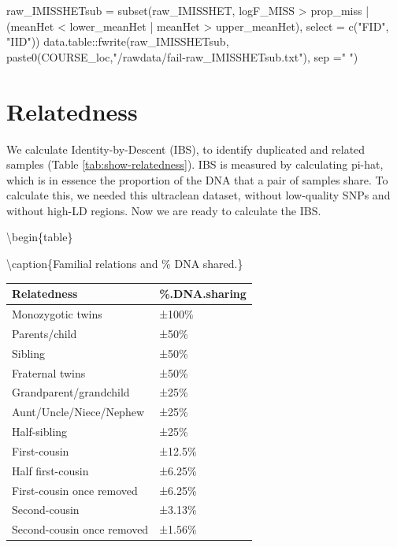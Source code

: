 \documentclass[
]{book}
\newenvironment{Shaded}{\begin{snugshade}}{\end{snugshade}}
\newcommand{\AttributeTok}[1]{\textcolor[rgb]{0.77,0.63,0.00}{#1}}
\newcommand{\FunctionTok}[1]{\textcolor[rgb]{0.00,0.00,0.00}{#1}}
\newcommand{\NormalTok}[1]{#1}
\newcommand{\OtherTok}[1]{\textcolor[rgb]{0.56,0.35,0.01}{#1}}
\newcommand{\SpecialCharTok}[1]{\textcolor[rgb]{0.00,0.00,0.00}{#1}}
\newcommand{\StringTok}[1]{\textcolor[rgb]{0.31,0.60,0.02}{#1}}
\begin{document}
\begin{Shaded}
\begin{Highlighting}[]
\NormalTok{raw\_IMISSHETsub }\OtherTok{=} \FunctionTok{subset}\NormalTok{(raw\_IMISSHET, logF\_MISS }\SpecialCharTok{\textgreater{}}\NormalTok{ prop\_miss }\SpecialCharTok{|}\NormalTok{ (meanHet }\SpecialCharTok{\textless{}}\NormalTok{ lower\_meanHet }\SpecialCharTok{|}\NormalTok{ meanHet }\SpecialCharTok{\textgreater{}}\NormalTok{ upper\_meanHet),}
                         \AttributeTok{select =} \FunctionTok{c}\NormalTok{(}\StringTok{"FID"}\NormalTok{, }\StringTok{"IID"}\NormalTok{))}
\NormalTok{data.table}\SpecialCharTok{::}\FunctionTok{fwrite}\NormalTok{(raw\_IMISSHETsub, }\FunctionTok{paste0}\NormalTok{(COURSE\_loc,}\StringTok{"/rawdata/fail{-}raw\_IMISSHETsub.txt"}\NormalTok{), }\AttributeTok{sep =}\StringTok{" "}\NormalTok{)}
\end{Highlighting}
\end{Shaded}

\hypertarget{relatedness}{%
\section{Relatedness}\label{relatedness}}

We calculate Identity-by-Descent (IBS), to identify duplicated and related samples (Table \ref{tab:show-relatedness}). IBS is measured by calculating pi-hat, which is in essence the proportion of the DNA that a pair of samples share. To calculate this, we needed this ultraclean dataset, without low-quality SNPs and without high-LD regions. Now we are ready to calculate the IBS.

\textbackslash begin\{table\}

\textbackslash caption\{\label{tab:show-relatedness}Familial relations and \% DNA shared.\}
\centering

\begin{tabular}[t]{l|l}
\hline
Relatedness & \%.DNA.sharing\\
\hline
Monozygotic twins & ±100\%\\
\hline
Parents/child & ±50\%\\
\hline
Sibling & ±50\%\\
\hline
Fraternal twins & ±50\%\\
\hline
Grandparent/grandchild & ±25\%\\
\hline
Aunt/Uncle/Niece/Nephew & ±25\%\\
\hline
Half-sibling & ±25\%\\
\hline
First-cousin & ±12.5\%\\
\hline
Half first-cousin & ±6.25\%\\
\hline
First-cousin once removed & ±6.25\%\\
\hline
Second-cousin & ±3.13\%\\
\hline
Second-cousin once removed & ±1.56\%\\
\hline
\end{tabular}
\end{document}
